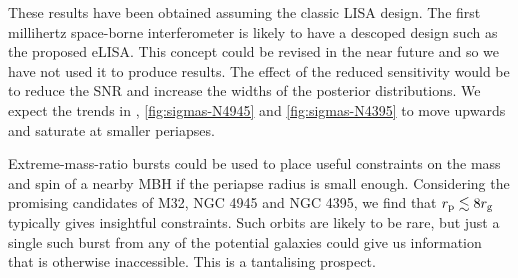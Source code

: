 These results have been obtained assuming the classic LISA design. The first millihertz space-borne interferometer is likely to have a descoped design such as the proposed eLISA. This concept could be revised in the near future and so we have not used it to produce results. The effect of the reduced sensitivity would be to reduce the SNR and increase the widths of the posterior distributions. We expect the trends in , \ref{fig:sigmas-N4945} and \ref{fig:sigmas-N4395} to move upwards and saturate at smaller periapses.

Extreme-mass-ratio bursts could be used to place useful constraints on the mass and spin of a nearby MBH if the periapse radius is small enough. Considering the promising candidates of M32, NGC 4945 and NGC 4395, we find that $r_\mathrm{p} \lesssim 8 r_\mathrm{g}$ typically gives insightful constraints. Such orbits are likely to be rare, but just a single such burst from any of the potential galaxies could give us information that is otherwise inaccessible. This is a tantalising prospect.
